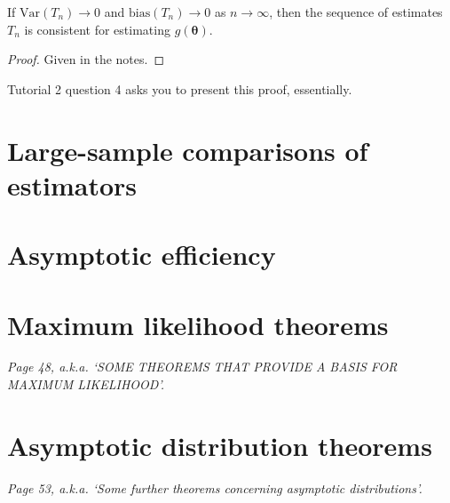 \begin{theorem}[Consistent]\label{thm:consistent}
    If \(\text{Var}(T_n)\to 0\) and \(\text{bias}(T_n)\to 0\) as \(n\to\infty\), then the sequence of estimates \(T_n\) is consistent for estimating \(g(\bm{\theta})\). 
\end{theorem}

\begin{proof}
    Given in the notes.
\end{proof}

\begin{exercise}
    Tutorial 2 question 4 asks you to present this proof, essentially. 
\end{exercise}


\section{Large-sample comparisons of estimators}\label{sec:large-sample comps}


\section{Asymptotic efficiency}\label{sec:asymptotic efficiency}



\section{Maximum likelihood theorems}\label{sec:ML thms}

\textit{Page 48, a.k.a. `SOME THEOREMS THAT PROVIDE A BASIS FOR MAXIMUM LIKELIHOOD'.}




\section{Asymptotic distribution theorems}\label{sec:asymptotic thms}

\textit{Page 53, a.k.a. `Some further theorems concerning asymptotic distributions'.}



